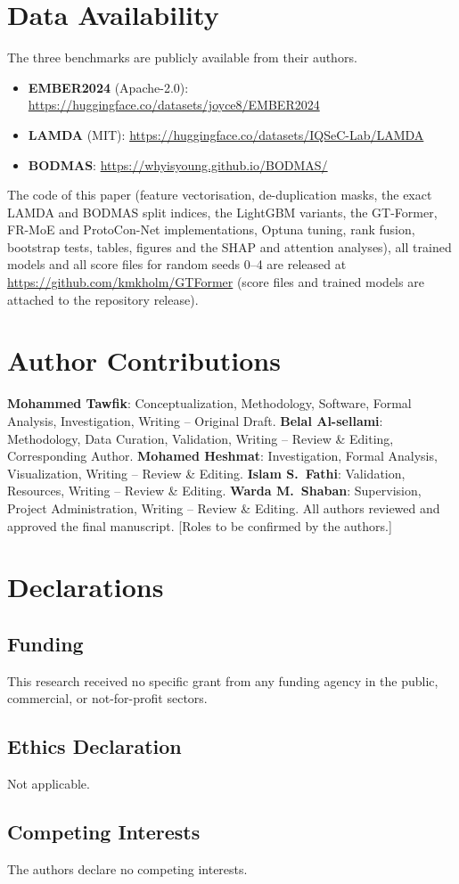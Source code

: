 \documentclass[fleqn,10pt]{wlscirep}
\newcommand{\gtf}{GT\mbox{-}Former}
\newcommand{\lgbm}{LightGBM}
\begin{document}
\section*{Data Availability}
The three benchmarks are publicly available from their authors.
\begin{itemize}[leftmargin=*]
    \item \textbf{EMBER2024} (Apache-2.0): \url{https://huggingface.co/datasets/joyce8/EMBER2024}
    \item \textbf{LAMDA} (MIT): \url{https://huggingface.co/datasets/IQSeC-Lab/LAMDA}
    \item \textbf{BODMAS}: \url{https://whyisyoung.github.io/BODMAS/}
\end{itemize}
The code of this paper (feature vectorisation, de-duplication masks, the exact LAMDA and BODMAS split indices, the \lgbm{} variants, the \gtf{}, FR-MoE and ProtoCon-Net implementations, Optuna tuning, rank fusion, bootstrap tests, tables, figures and the SHAP and attention analyses), all trained models and all score files for random seeds 0--4 are released at \url{https://github.com/kmkholm/GTFormer} (score files and trained models are attached to the repository release).



\section*{Author Contributions}
\textbf{Mohammed Tawfik}: Conceptualization, Methodology, Software, Formal Analysis, Investigation, Writing -- Original Draft.
\textbf{Belal Al-sellami}: Methodology, Data Curation, Validation, Writing -- Review \& Editing, Corresponding Author.
\textbf{Mohamed Heshmat}: Investigation, Formal Analysis, Visualization, Writing -- Review \& Editing.
\textbf{Islam S.~Fathi}: Validation, Resources, Writing -- Review \& Editing.
\textbf{Warda M.~Shaban}: Supervision, Project Administration, Writing -- Review \& Editing.
All authors reviewed and approved the final manuscript. [Roles to be confirmed by the authors.]

\section*{Declarations}
\subsection*{Funding}
This research received no specific grant from any funding agency in the public, commercial, or not-for-profit sectors.

\subsection*{Ethics Declaration}
Not applicable.

\subsection*{Competing Interests}
The authors declare no competing interests.
\end{document}
